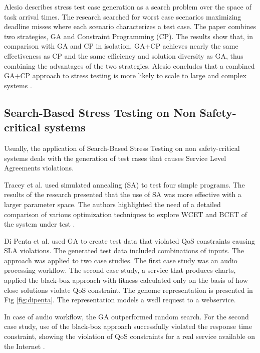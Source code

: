 \documentclass{bmcart}
\begin{document}
Alesio describes stress test case generation as a search problem over the space of task arrival times. The research searched for worst case scenarios maximizing deadline misses where each scenario characterizes a test case. The paper combines two strategies, GA and Constraint Programming (CP). The results show that, in comparison with GA and CP in isolation, GA+CP achieves nearly the same effectiveness as CP and the same efficiency and solution diversity as GA, thus combining the advantages of the two strategies. Alesio concludes that a combined GA+CP approach to stress testing is more likely to scale to large and complex systems \citep{Alesio2015}.

\subsection{Search-Based Stress Testing on Non Safety-critical systems} 

Usually, the application of Search-Based Stress Testing on non safety-critical systems deals with the generation of test cases that causes Service Level Agreements violations.


Tracey et al. \citep{Tracey1998} used simulated annealing (SA) to test four
simple programs. The results of the research presented that the use of SA was more effective with a larger parameter space. The authors highlighted the need of a detailed comparison of various optimization techniques to explore WCET and BCET of the system under test \citep{Tracey1998}.

Di Penta et al. \citep{Penta2007} used GA to create test data that violated QoS constraints causing SLA violations. The generated test data included combinations of inputs. The approach was applied to two case studies. The first case study was an audio processing workflow. The second case study, a service that produces charts, applied the black-box approach with fitness calculated only on the basis of how close solutions violate QoS constraint. The genome representation is presented in Fig \ref{fig:dipenta}. The representation models a wsdl request to a webservice.

In case of audio workflow, the GA outperformed random search. For the second case study, use of the black-box approach successfully violated the response time constraint, showing the violation of QoS constraints for a real service available on the Internet \citep{Penta2007}.
\end{document}
